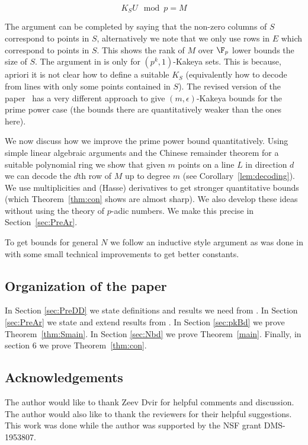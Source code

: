 \begin{equation}\label{eq:proofOverTorusPoly}
    K_SU  \mod p = M
\end{equation}

The argument can be completed by saying that the non-zero columns of $S$ correspond to points in $S$, alternatively we note that we only use rows in $E$ which correspond to points in $S$. This shows the rank of $M$ over $\F_p$ lower bounds the size of $S$. The argument in \cite{arsovski2021padic} is only for $(p^k,1)$-Kakeya sets. This is because, apriori it is not clear how to define a suitable $K_S$ (equivalently how to decode from lines with only some points contained in $S$). The revised version of the paper~\cite{arsovskiNew} has a very different approach to give $(m,\epsilon)$-Kakeya bounds for the prime power case (the bounds there are quantitatively weaker than the ones here).

We now discuss how we improve the prime power bound quantitatively. Using simple linear algebraic arguments and the Chinese remainder theorem for a suitable polynomial ring we show that given $m$ points on a line $L$ in direction $d$ we can decode the $d$th row of $M$ up to degree $m$ (see Corollary~\ref{lem:decoding}). We use multiplicities and (Hasse) derivatives to get stronger quantitative bounds (which Theorem~\ref{thm:con} shows are almost sharp). We also develop these ideas without using the theory of $p$-adic numbers. We make this precise in Section~\ref{sec:PreAr}.

To get bounds for general $N$ we follow an inductive style argument as was done in \cite{dhar2021proof} with some small technical improvements to get better constants.

\subsection{Organization of the paper}
In Section \ref{sec:PreDD} we state definitions and results we need from \cite{dhar2021proof}. In Section \ref{sec:PreAr} we state and extend results from \cite{arsovski2021padic}. In Section \ref{sec:pkBd} we prove Theorem~\ref{thm:Smain}. In Section \ref{sec:Nbd} we prove Theorem~\ref{main}. Finally, in section 6 we prove Theorem~\ref{thm:con}.

\subsection{Acknowledgements}
The author would like to thank Zeev Dvir for helpful comments and discussion. The author would also like to thank the reviewers for their helpful suggestions. This work was done while the author was supported by the NSF grant DMS-1953807.

